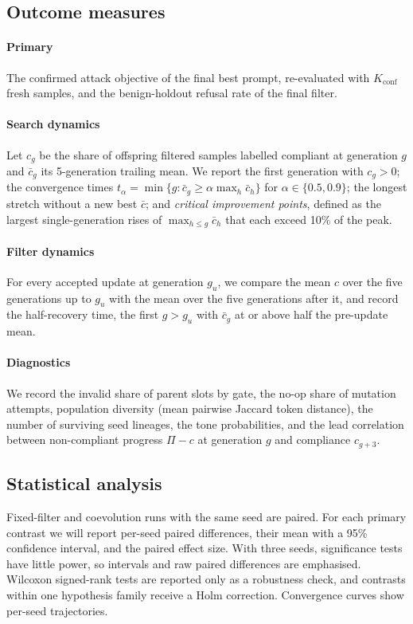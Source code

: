\documentclass[preprint,12pt,authoryear]{elsarticle}
\begin{document}
\subsection{Outcome measures}
\paragraph{Primary} The confirmed attack objective of the final best prompt, re-evaluated with $K_{\mathrm{conf}}$ fresh samples, and the benign-holdout refusal rate of the final filter.

\paragraph{Search dynamics} Let $c_g$ be the share of offspring filtered samples labelled compliant at generation $g$ and $\bar c_g$ its 5-generation trailing mean. We report the first generation with $c_g>0$; the convergence times $t_\alpha=\min\{g:\bar c_g\geq\alpha\max_h\bar c_h\}$ for $\alpha\in\{0.5,0.9\}$; the longest stretch without a new best $\bar c$; and \emph{critical improvement points}, defined as the largest single-generation rises of $\max_{h\le g}\bar c_h$ that each exceed 10\% of the peak.

\paragraph{Filter dynamics} For every accepted update at generation $g_u$, we compare the mean $c$ over the five generations up to $g_u$ with the mean over the five generations after it, and record the half-recovery time, the first $g>g_u$ with $\bar c_g$ at or above half the pre-update mean.

\paragraph{Diagnostics} We record the invalid share of parent slots by gate, the no-op share of mutation attempts, population diversity (mean pairwise Jaccard token distance), the number of surviving seed lineages, the tone probabilities, and the lead correlation between non-compliant progress $\Pi-c$ at generation $g$ and compliance $c_{g+3}$.

\subsection{Statistical analysis}
Fixed-filter and coevolution runs with the same seed are paired. For each primary contrast we will report per-seed paired differences, their mean with a 95\% confidence interval, and the paired effect size. With three seeds, significance tests have little power, so intervals and raw paired differences are emphasised. Wilcoxon signed-rank tests are reported only as a robustness check, and contrasts within one hypothesis family receive a Holm correction. Convergence curves show per-seed trajectories.
\end{document}
